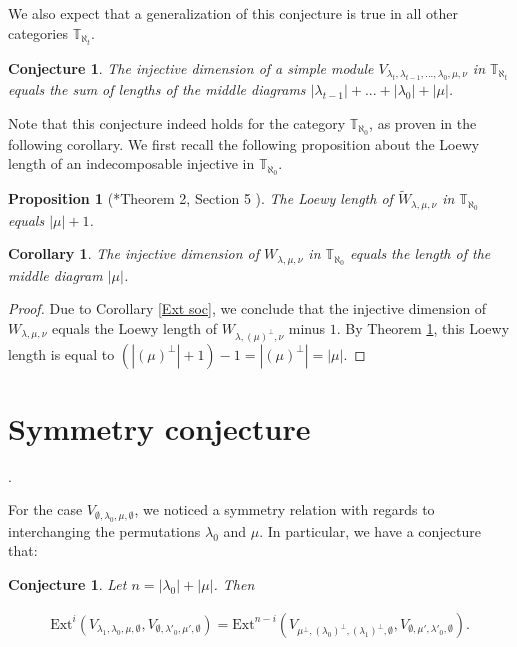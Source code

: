 \documentclass[openany, a4paper]{amsbook}
\newtheorem{prop}[thm]{Proposition}
\newtheorem{conj}[thm]{Conjecture}
\newtheorem{cor}[thm]{Corollary}
\theoremstyle{definition}
\numberwithin{equation}{chapter}
\newcommand{\T}[1]{{\mathbb{T}}_{\aleph_{#1}}}
\newcommand{\Ext}[4]{\mathrm{Ext}^{#1}_{#2}({#3}, {#4})}
\begin{document}
We also expect that a generalization of this conjecture is true in all other categories $\T{t}$. 
\begin{conj}\label{injective dimension 2}
    The injective dimension of a simple module $V_{\lambda_t, \lambda_{t-1}, ..., \lambda_0, \mu, \nu}$ in $\T{t}$ equals the sum of lengths of the middle diagrams $\left\lvert \lambda_{t-1} \right\rvert + ... + \left\lvert \lambda_0 \right\rvert + \left\lvert \mu \right\rvert$.
\end{conj}

Note that this conjecture indeed holds for the category $\T{0}$, as proven in the following corollary. We first recall the following proposition about the Loewy length of an indecomposable injective in $\T{0}$.
\begin{prop}[\cite{s18}*{Theorem 2, Section 5} ]\label{socle length}
    The Loewy length of $\tilde{W}_{\lambda, \mu, \nu}$ in $\T{0}$ equals $\left\lvert \mu \right\rvert  + 1$.
\end{prop}

\begin{cor}
    The injective dimension of $W_{\lambda, \mu, \nu}$ in $\T{0}$ equals the length of the middle diagram $\left\lvert \mu \right\rvert$.
\end{cor}

\begin{proof}
    Due to Corollary \ref{Ext soc}, we conclude that the injective dimension of $W_{\lambda, \mu, \nu}$ equals the Loewy length of $W_{\lambda, (\mu)^\perp, \nu}$ minus $1$. By Theorem \ref{socle length}, this Loewy length is equal to $(\left\lvert (\mu)^\perp \right\rvert  + 1) - 1 = \left\lvert (\mu)^\perp \right\rvert = \left\lvert \mu \right\rvert$.
\end{proof}


\section{Symmetry conjecture}.

For the case $V_{\emptyset, \lambda_0, \mu, \emptyset}$, we noticed a symmetry relation with regards to interchanging the permutations $\lambda_0$ and $\mu$. In particular, we have a conjecture that:

\begin{conj}
    Let $n = |\lambda_0| + |\mu|$. Then

    \begin{align*}
        \Ext{i}{}{V_{\lambda_1, \lambda_0, \mu, \emptyset}}{ V_{\emptyset, \lambda'_0, \mu', \emptyset}} = \Ext{n-i}{}{V_{\mu^\perp,  (\lambda_0)^\perp, (\lambda_1)^\perp, \emptyset}}{V_{\emptyset, \mu', \lambda'_0, \emptyset}}.
    \end{align*}
\end{conj}
\end{document}
